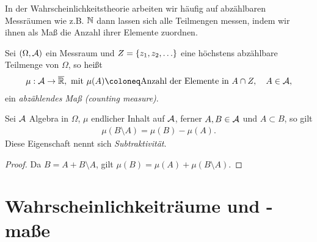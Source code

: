 In der Wahrscheinlichkeitstheorie arbeiten wir häufig auf abzählbaren
Messräumen wie z.B. $\N$ dann lassen sich alle Teilmengen messen, indem wir
ihnen als Maß die Anzahl ihrer Elemente zuordnen.

\begin{defn}
\label{defn:1.6}
Sei $(\Omega, \AA)$ ein Messraum und $Z =\setd{z_{1}, z_{2},
\ldots}$ eine höchstens abzählbare Teilmenge von $\Omega $, so heißt
\begin{align*}
\mu: \AA\to \overline{\R}, \text{ mit } \mu (A)\defl \text{Anzahl der Elemente
in } A\cap Z,\quad A \in \AA,
\end{align*}
 ein \emph{abzählendes Maß (counting measure)}.\fishhere
\end{defn}

\begin{bem}
\label{bem:1.2} Sei $\AA$ Algebra in $\Omega$, $\mu $ endlicher Inhalt auf
$\AA$, ferner $A,B \in \AA$ und $ A \subset B$, so gilt
\begin{align*}
\mu(B\setminus A) = \mu (B) - \mu(A).
\end{align*}
Diese Eigenschaft nennt sich \emph{Subtraktivität}.\maphere
\end{bem}
\begin{proof}
Da $B=A+B\setminus A$, gilt $\mu(B) = \mu(A) + \mu(B\setminus A)$.\qedhere
\end{proof}

\clearpage
\section{Wahrscheinlichkeiträume und -maße}
\label{chap:1.b}

